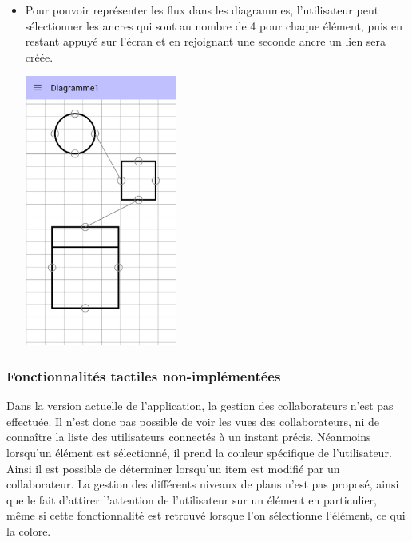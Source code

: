 \begin{itemize}
\begin{minipage}{\linewidth}
		\end{minipage}
\item Pour pouvoir représenter les flux dans les diagrammes, l'utilisateur peut sélectionner les ancres qui sont au nombre de 4 pour chaque élément, puis en restant appuyé sur l'écran et en rejoignant une seconde ancre un lien sera créée.\par
		\begin{minipage}{\linewidth}
			\centering
			\includegraphics[width=5cm]{img/screen/new/colladia_draw_view_element_links}
		\end{minipage}
\end{itemize}
	
\subsubsection{Fonctionnalités tactiles non-implémentées}

Dans la version actuelle de l'application, la gestion des collaborateurs n'est pas effectuée. Il n'est donc pas possible de voir les vues des collaborateurs, ni de connaître la liste des utilisateurs connectés à un instant précis. Néanmoins lorsqu'un élément est sélectionné, il prend la couleur spécifique de l'utilisateur. Ainsi il est possible de déterminer lorsqu'un item est modifié par un collaborateur. 
La gestion des différents niveaux de plans n'est pas proposé, ainsi que le fait d'attirer l'attention de l'utilisateur sur un élément en particulier, même si cette fonctionnalité est retrouvé lorsque l'on sélectionne l'élément, ce qui la colore. 

